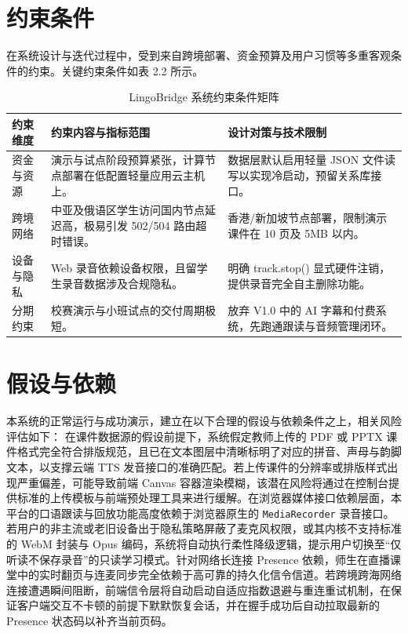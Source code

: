 \section{约束条件}
在系统设计与迭代过程中，受到来自跨境部署、资金预算及用户习惯等多重客观条件的约束。关键约束条件如表 2.2 所示。

\begin{table}[H]
\centering
\caption{LingoBridge 系统约束条件矩阵}
\begin{tabularx}{\textwidth}{l p{5cm} X}
\toprule
\textbf{约束维度} & \textbf{约束内容与指标范围} & \textbf{设计对策与技术限制} \\
\midrule
资金与资源 & 演示与试点阶段预算紧张，计算节点部署在低配置轻量应用云主机上。 & 数据层默认启用轻量 JSON 文件读写以实现冷启动，预留关系库接口。 \\
跨境网络 & 中亚及俄语区学生访问国内节点延迟高，极易引发 502/504 路由超时错误。 & 香港/新加坡节点部署，限制演示课件在 10 页及 5MB 以内。 \\
设备与隐私 & Web 录音依赖设备权限，且留学生录音数据涉及合规隐私。 & 明确 track.stop() 显式硬件注销，提供录音完全自主删除功能。 \\
分期约束 & 校赛演示与小班试点的交付周期极短。 & 放弃 V1.0 中的 AI 字幕和付费系统，先跑通跟读与音频管理闭环。 \\
\bottomrule
\end{tabularx}
\end{table}

\section{假设与依赖}
本系统的正常运行与成功演示，建立在以下合理的假设与依赖条件之上，相关风险评估如下：
在课件数据源的假设前提下，系统假定教师上传的 PDF 或 PPTX 课件格式完全符合排版规范，且已在文本图层中清晰标明了对应的拼音、声母与韵脚文本，以支撑云端 TTS 发音接口的准确匹配。若上传课件的分辨率或排版样式出现严重偏差，可能导致前端 Canvas 容器渲染模糊，该潜在风险将通过在控制台提供标准的上传模板与前端预处理工具来进行缓解。在浏览器媒体接口依赖层面，本平台的口语跟读与回放功能高度依赖于浏览器原生的 \texttt{MediaRecorder} 录音接口。若用户的非主流或老旧设备出于隐私策略屏蔽了麦克风权限，或其内核不支持标准的 WebM 封装与 Opus 编码，系统将自动执行柔性降级逻辑，提示用户切换至“仅听读不保存录音”的只读学习模式。针对网络长连接 Presence 依赖，师生在直播课堂中的实时翻页与连麦同步完全依赖于高可靠的持久化信令信道。若跨境跨海网络连接遭遇瞬间阻断，前端信令层将自动启动自适应指数退避与重连重试机制，在保证客户端交互不卡顿的前提下默默恢复会话，并在握手成功后自动拉取最新的 Presence 状态码以补齐当前页码。

